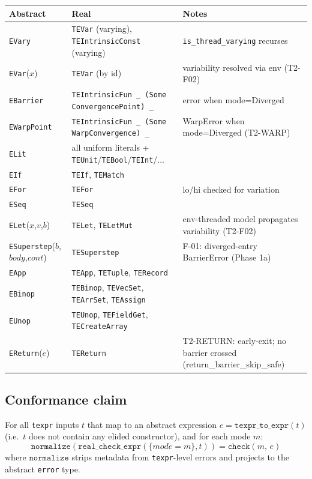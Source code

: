 \documentclass[11pt,a4paper]{article}
\theoremstyle{definition}
\theoremstyle{plain}
\theoremstyle{remark}
\newcommand{\chk}[2]{\mathtt{check}(#1,\,#2)}
\begin{document}
\begin{center}
\begin{tabular}{l l l}
\hline
Abstract & Real & Notes \\
\hline
\texttt{EVary} & \texttt{TEVar} (varying), \texttt{TEIntrinsicConst} (varying) & \texttt{is\_thread\_varying} recurses \\
\texttt{EVar}($x$) & \texttt{TEVar} (by id) & variability resolved via env (T2-F02) \\
\texttt{EBarrier} & \texttt{TEIntrinsicFun \_ (Some ConvergencePoint) \_} & error when mode=Diverged \\
\texttt{EWarpPoint} & \texttt{TEIntrinsicFun \_ (Some WarpConvergence) \_} & WarpError when mode=Diverged (T2-WARP) \\
\texttt{ELit} & all uniform literals + \texttt{TEUnit}/\texttt{TEBool}/\texttt{TEInt}/... & \\
\texttt{EIf} & \texttt{TEIf}, \texttt{TEMatch} & \\
\texttt{EFor} & \texttt{TEFor} & lo/hi checked for variation \\
\texttt{ESeq} & \texttt{TESeq} & \\
\texttt{ELet}($x$,$v$,$b$) & \texttt{TELet}, \texttt{TELetMut} & env-threaded model propagates variability (T2-F02) \\
\texttt{ESuperstep}($b$,$body$,$cont$) & \texttt{TESuperstep} & F-01: diverged-entry BarrierError (Phase 1a) \\
\texttt{EApp} & \texttt{TEApp}, \texttt{TETuple}, \texttt{TERecord} & \\
\texttt{EBinop} & \texttt{TEBinop}, \texttt{TEVecSet}, \texttt{TEArrSet}, \texttt{TEAssign} & \\
\texttt{EUnop} & \texttt{TEUnop}, \texttt{TEFieldGet}, \texttt{TECreateArray} & \\
\texttt{EReturn}($e$) & \texttt{TEReturn} & T2-RETURN: early-exit; no barrier crossed (return\_barrier\_skip\_safe) \\
\hline
\end{tabular}
\end{center}

\subsection*{Conformance claim}

For all \texttt{texpr} inputs $t$ that map to an abstract expression
$e = \mathtt{texpr\_to\_expr}(t)$ (i.e.\ $t$ does not contain any elided
constructor), and for each mode $m$:
\[
  \mathtt{normalize}(\mathtt{real\_check\_expr}(\{mode=m\}, t))
  = \chk{m}{e}
\]
where $\mathtt{normalize}$ strips metadata from \texttt{texpr}-level errors and
projects to the abstract \texttt{error} type.
\end{document}
